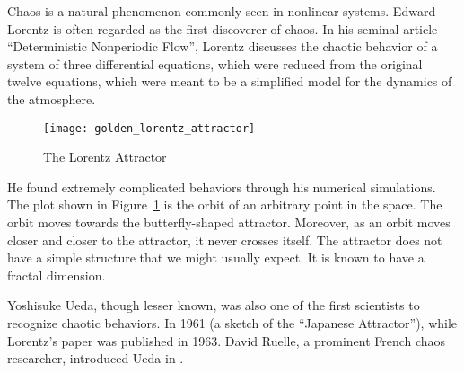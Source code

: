 \documentclass[10pt,twoside,draft]{book}
\begin{document}
Chaos is a natural phenomenon commonly seen in nonlinear systems.
Edward Lorentz is often regarded as the first discoverer of chaos.
In his seminal article ``Deterministic Nonperiodic Flow'', Lorentz discusses the chaotic behavior of a system of three differential equations, which were reduced from the original twelve equations, which were meant to be a simplified model for the dynamics of the atmosphere.
\begin{figure}[ht]
  \centering
  \texttt{[image: golden\_lorentz\_attractor]}
  \caption{The Lorentz Attractor}
  \label{fig:lorentz}
\end{figure}
He found extremely complicated behaviors through his numerical simulations.
The plot shown in Figure~\ref{fig:lorentz} is the orbit of an arbitrary point in the space.
The orbit moves towards the butterfly-shaped attractor.
Moreover, as an orbit moves closer and closer to the attractor, it never crosses itself.
The attractor does not have a simple structure that we might usually expect.
It is known to have a fractal dimension.

Yoshisuke Ueda, though lesser known, was also one of the first scientists to recognize chaotic behaviors.
In 1961 (a sketch of the ``Japanese Attractor''), while Lorentz's paper was published in 1963.
David Ruelle, a prominent French chaos researcher, introduced Ueda in \citep{ruelle}.
\end{document}
